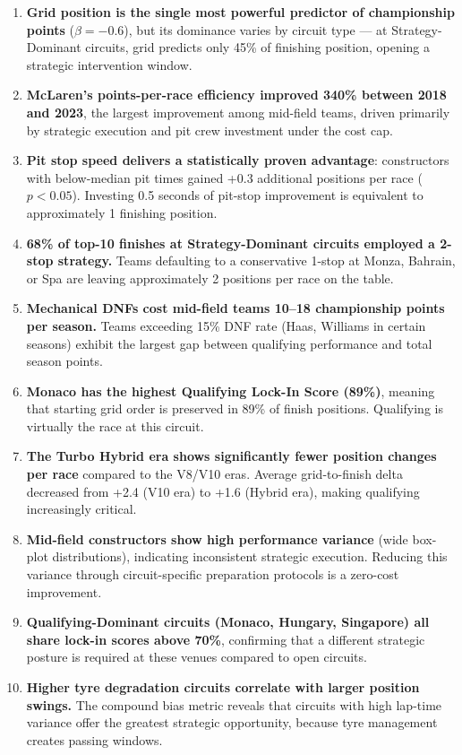 \documentclass[12pt, a4paper]{article}
\begin{document}
\begin{enumerate}
    \item \textbf{Grid position is the single most powerful predictor of championship points} ($\beta = -0.6$), but its dominance varies by circuit type --- at Strategy-Dominant circuits, grid predicts only 45\% of finishing position, opening a strategic intervention window.

    \item \textbf{McLaren's points-per-race efficiency improved 340\% between 2018 and 2023}, the largest improvement among mid-field teams, driven primarily by strategic execution and pit crew investment under the cost cap.

    \item \textbf{Pit stop speed delivers a statistically proven advantage}: constructors with below-median pit times gained +0.3 additional positions per race ($p < 0.05$). Investing 0.5 seconds of pit-stop improvement is equivalent to approximately 1 finishing position.

    \item \textbf{68\% of top-10 finishes at Strategy-Dominant circuits employed a 2-stop strategy.} Teams defaulting to a conservative 1-stop at Monza, Bahrain, or Spa are leaving approximately 2 positions per race on the table.

    \item \textbf{Mechanical DNFs cost mid-field teams 10--18 championship points per season.} Teams exceeding 15\% DNF rate (Haas, Williams in certain seasons) exhibit the largest gap between qualifying performance and total season points.

    \item \textbf{Monaco has the highest Qualifying Lock-In Score (89\%)}, meaning that starting grid order is preserved in 89\% of finish positions. Qualifying is virtually the race at this circuit.

    \item \textbf{The Turbo Hybrid era shows significantly fewer position changes per race} compared to the V8/V10 eras. Average grid-to-finish delta decreased from +2.4 (V10 era) to +1.6 (Hybrid era), making qualifying increasingly critical.

    \item \textbf{Mid-field constructors show high performance variance} (wide box-plot distributions), indicating inconsistent strategic execution. Reducing this variance through circuit-specific preparation protocols is a zero-cost improvement.

    \item \textbf{Qualifying-Dominant circuits (Monaco, Hungary, Singapore) all share lock-in scores above 70\%}, confirming that a different strategic posture is required at these venues compared to open circuits.

    \item \textbf{Higher tyre degradation circuits correlate with larger position swings.} The compound bias metric reveals that circuits with high lap-time variance offer the greatest strategic opportunity, because tyre management creates passing windows.
\end{enumerate}
\end{document}
